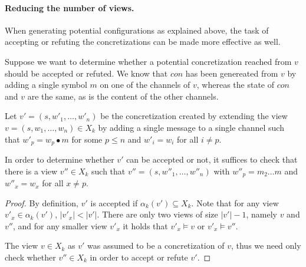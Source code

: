 \paragraph{Reducing the number of views.}
When generating potential configurations as explained above, the task of accepting or refuting the concretizations can be made more effective as well.

Suppose we want to determine whether a potential concretization  reached from $v$ should be accepted or refuted. We know that $con$ has been genereated from $v$ by adding a single symbol $m$ on one of the channels of $v$, whereas the state of $con$ and $v$ are the same, as is the content of the other channels.

\begin{lemma}
Let $v' = (s, w'_1, \ldots, w'_n)$ be the concretization created by extending the view $v = (s, w_1, \ldots, w_n) \in X_k$ by adding a single message to a single channel such that $w'_p = w_p \bullet m$ for some $p\leq n$ and $w'_i = w_i$ for all $i \neq p$.

In order to determine whether $v'$ can be accepted or not, it suffices to check that there is a view $v'' \in X_k$ such that $v'' = (s, w''_1, \ldots, w''_n)$ with $w''_p = m_2\ldots m$ and $w''_x = w_x$ for all $x \neq p$.
\end{lemma}

\begin{proof}
\label{altproof}
By definition, $v'$ is accepted if $\alpha_k(v') \subseteq X_k$. Note that for any view $v'_x \in \alpha_k(v')$, $|v'_x| < |v'|$. There are only two views of size $|v'| - 1$, namely $v$ and $v''$, and for any smaller view $v'_x$ it holds that $v'_x \models v$ or $v'_x \models v''$.

The view $v \in X_k$ as $v'$ was assumed to be a concretization of $v$, thus we need only check whether $v'' \in X_k$ in order to accept or refute $v'$.

\end{proof}




